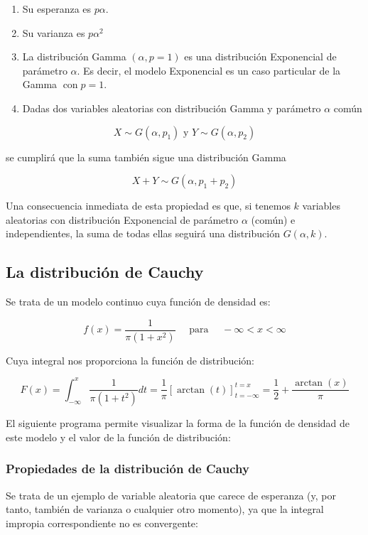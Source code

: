 \documentclass[
  a4paper,
  DIV=11,
  numbers=noendperiod]{scrreprt}
\begin{document}
\begin{enumerate}
\def\labelenumi{\arabic{enumi}.}
\item
  Su esperanza es \(p \alpha\).
\item
  Su varianza es \(p \alpha^{2}\)
\item
  La distribución Gamma \((\alpha, p=1)\) es una distribución
  Exponencial de parámetro \(\alpha\). Es decir, el modelo Exponencial
  es un caso particular de la Gamma \(\operatorname{con} p=1\).
\item
  Dadas dos variables aleatorias con distribución Gamma y parámetro
  \(\alpha\) común
\end{enumerate}

\[
X \sim G\left(\alpha, p_{1}\right) \text { y } Y \sim G\left(\alpha, p_{2}\right)
\]

se cumplirá que la suma también sigue una distribución Gamma

\[
X+Y \sim G\left(\alpha, p_{1}+p_{2}\right)
\]

Una consecuencia inmediata de esta propiedad es que, si tenemos \(k\)
variables aleatorias con distribución Exponencial de parámetro
\(\alpha\) (común) e independientes, la suma de todas ellas seguirá una
distribución \(G(\alpha, k)\).

\subsection{La distribución de
Cauchy}\label{la-distribuciuxf3n-de-cauchy}

Se trata de un modelo continuo cuya función de densidad es:

\[
f(x)=\frac{1}{\pi\left(1+x^{2}\right)} \quad \text { para } \quad-\infty<x<\infty
\]

Cuya integral nos proporciona la función de distribución:

\[
F(x)=\int_{-\infty}^{x} \frac{1}{\pi\left(1+t^{2}\right)} d t=\frac{1}{\pi}[\arctan (t)]_{t=-\infty}^{t=x}=\frac{1}{2}+\frac{\arctan (x)}{\pi}
\]

El siguiente programa permite visualizar la forma de la función de
densidad de este modelo y el valor de la función de distribución:

\subsubsection{Propiedades de la distribución de
Cauchy}\label{propiedades-de-la-distribuciuxf3n-de-cauchy}

Se trata de un ejemplo de variable aleatoria que carece de esperanza (y,
por tanto, también de varianza o cualquier otro momento), ya que la
integral impropia correspondiente no es convergente:
\end{document}
